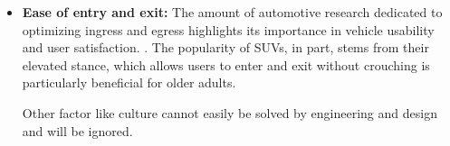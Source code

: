 \begin{itemize}
    \item \textbf{Ease of entry and exit:} The amount of automotive research dedicated to optimizing ingress and egress highlights its importance in vehicle usability and user satisfaction. \cite{roof_height_ingress} \cite{giacomin_analysis_1997} \cite{causse_dynamic_2009}. The popularity of SUVs, in part, stems from their elevated stance, which allows users to enter and exit without crouching is particularly beneficial for older adults.

Other factor like culture cannot easily be solved by engineering and design and will be ignored.
\end{itemize}

